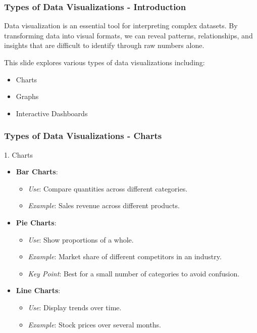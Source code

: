 \documentclass{beamer}
\begin{document}
\begin{frame}[fragile]
    \frametitle{Types of Data Visualizations - Introduction}
    Data visualization is an essential tool for interpreting complex datasets. By transforming data into visual formats, we can reveal patterns, relationships, and insights that are difficult to identify through raw numbers alone.
    
    This slide explores various types of data visualizations including:
    \begin{itemize}
        \item Charts
        \item Graphs
        \item Interactive Dashboards
    \end{itemize}
\end{frame}

\begin{frame}[fragile]
    \frametitle{Types of Data Visualizations - Charts}
    \begin{block}{1. Charts}
        \begin{itemize}
            \item \textbf{Bar Charts}:
                \begin{itemize}
                    \item \textit{Use}: Compare quantities across different categories.
                    \item \textit{Example}: Sales revenue across different products.
                \end{itemize}
            \item \textbf{Pie Charts}:
                \begin{itemize}
                    \item \textit{Use}: Show proportions of a whole.
                    \item \textit{Example}: Market share of different competitors in an industry.
                    \item \textit{Key Point}: Best for a small number of categories to avoid confusion.
                \end{itemize}
            \item \textbf{Line Charts}:
                \begin{itemize}
                    \item \textit{Use}: Display trends over time.
                    \item \textit{Example}: Stock prices over several months.
                \end{itemize}
        \end{itemize}
    \end{block}
\end{frame}
\end{document}
